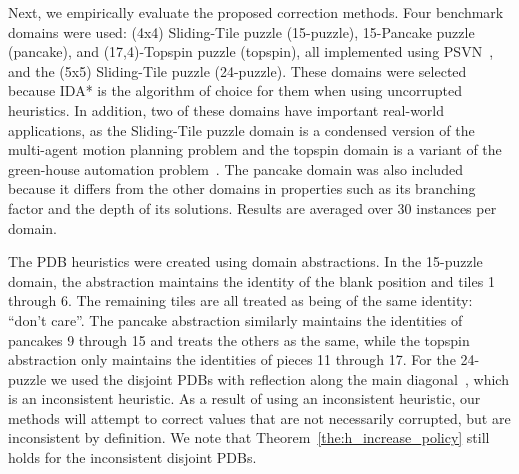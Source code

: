 \documentclass[letterpaper]{article}
\begin{document}
Next, we empirically evaluate the proposed correction methods. %
Four benchmark domains were used: (4x4) Sliding-Tile puzzle (15-puzzle), 15-Pancake puzzle (pancake), and (17,4)-Topspin puzzle (topspin), all implemented using PSVN~\cite{psvn}, and the (5x5) Sliding-Tile puzzle (24-puzzle). %
These domains were selected because IDA* is the algorithm of choice for them when using uncorrupted heuristics. In addition, two of these domains have important real-world applications, as the Sliding-Tile puzzle domain is a condensed version of the multi-agent motion planning problem and the topspin domain is a variant of the green-house automation problem~\cite{HelmertL10}. The pancake domain was also included because it differs from the other domains in properties such as its branching factor and the depth of its solutions. Results are averaged over 30 instances per domain. 




The PDB heuristics were created using domain abstractions. In the 15-puzzle domain, the abstraction maintains the identity of the blank position and tiles 1 through 6. The remaining tiles are all treated as being of the same identity: ``don't care''. The pancake abstraction similarly maintains the identities of pancakes 9 through 15 and treats the others as the same, while the topspin abstraction only maintains the identities of pieces 11 through 17. 
%
For the 24-puzzle we used the disjoint PDBs with reflection along the main diagonal~\cite{korf2002disjointPatternDatabase}, which is an inconsistent heuristic. As a result of using an inconsistent heuristic, our methods will attempt to correct values that are not necessarily corrupted, but are inconsistent by definition. We note that Theorem~\ref{the:h_increase_policy} still holds for the inconsistent disjoint PDBs.
\end{document}
